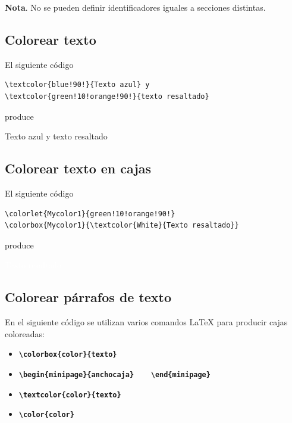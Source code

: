 \documentclass[12pt,a4paper,oneside,]{book}
\providecommand{\tightlist}{%
  \setlength{\itemsep}{0pt}\setlength{\parskip}{0pt}}
\numberwithin{dummy}{section}
\theoremstyle{ocrenumbox}
\theoremstyle{blacknumex}
\theoremstyle{blacknumbox}
\theoremstyle{ocrenum}
\theoremstyle{ocrenum}
\begin{document}
\textbf{Nota}. No se pueden definir identificadores iguales a secciones
distintas.

\hypertarget{colorear-texto}{%
\subsection{Colorear texto}\label{colorear-texto}}

El siguiente código

\begin{verbatim}
\textcolor{blue!90!}{Texto azul} y 
\textcolor{green!10!orange!90!}{texto resaltado}
\end{verbatim}

produce

\textcolor{blue!90!}{Texto azul} y
\textcolor{green!10!orange!90!}{texto resaltado}

\hypertarget{colorear-texto-en-cajas}{%
\subsection{Colorear texto en cajas}\label{colorear-texto-en-cajas}}

El siguiente código

\begin{verbatim}
\colorlet{Mycolor1}{green!10!orange!90!}
\colorbox{Mycolor1}{\textcolor{White}{Texto resaltado}}
\end{verbatim}

produce


\colorbox{Mycolor1}{\textcolor{White}{Texto resaltado}}

\hypertarget{colorear-puxe1rrafos-de-texto}{%
\subsection{Colorear párrafos de
texto}\label{colorear-puxe1rrafos-de-texto}}

En el siguiente código se utilizan varios comandos LaTeX para producir
cajas coloreadas:

\begin{itemize}
\tightlist
\item
  \textbf{\texttt{\textbackslash{}colorbox\{color\}\{texto\}}}
\item
  \textbf{\texttt{\textbackslash{}begin\{minipage\}\{anchocaja\}\ \ \ \ \textbackslash{}end\{minipage\}}}
\item
  \textbf{\texttt{\textbackslash{}textcolor\{color\}\{texto\}}}
\item
  \textbf{\texttt{\textbackslash{}color\{color\}}}
\end{itemize}
\end{document}
